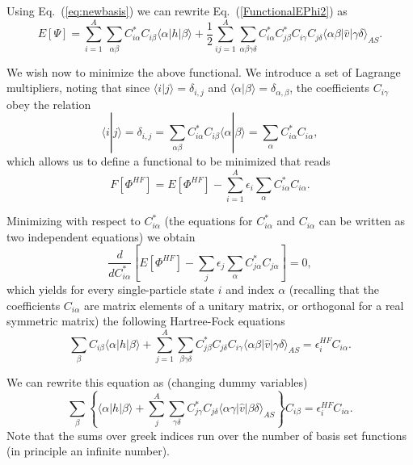 Using Eq.~(\ref{eq:newbasis}) we can rewrite
Eq.~(\ref{FunctionalEPhi2}) as
\begin{equation}
  E[\Psi] 
  = \sum_{i=1}^A \sum_{\alpha\beta} C^*_{i\alpha}C_{i\beta}\langle \alpha | h | \beta \rangle +
  \frac{1}{2}\sum_{ij=1}^A\sum_{{\alpha\beta\gamma\delta}} C^*_{i\alpha}C^*_{j\beta}C_{i\gamma}C_{j\delta}\langle \alpha\beta|\hat{v}|\gamma\delta\rangle_{AS}. \label{FunctionalEPhi3}
\end{equation}


We wish now to minimize the above functional. We introduce a set
of Lagrange multipliers, noting that since $\langle i | j \rangle
= \delta_{i,j}$ and $\langle \alpha | \beta \rangle
= \delta_{\alpha,\beta}$, the coefficients $C_{i\gamma}$ obey the relation
\[
 \langle i | j \rangle=\delta_{i,j}=\sum_{\alpha\beta} C^*_{i\alpha}C_{i\beta}\langle \alpha | \beta \rangle=
\sum_{\alpha} C^*_{i\alpha}C_{i\alpha},
\]
which allows us to define a functional to be minimized that reads
\begin{equation}
  F[\Phi^{HF}]=E[\Phi^{HF}] - \sum_{i=1}^A\epsilon_i\sum_{\alpha} C^*_{i\alpha}C_{i\alpha}.
\end{equation}


Minimizing with respect to $C^*_{i\alpha}$ (the
equations for $C^*_{i\alpha}$ and $C_{i\alpha}$ can be written as two
independent equations) we obtain
\[
\frac{d}{dC^*_{i\alpha}}\left[  E[\Phi^{HF}] - \sum_{j}\epsilon_j\sum_{\alpha} C^*_{j\alpha}C_{j\alpha}\right]=0,
\]
which yields for every single-particle state $i$ and index $\alpha$
(recalling that the coefficients $C_{i\alpha}$ are matrix elements of
a unitary matrix, or orthogonal for a real symmetric matrix) the
following Hartree-Fock equations
\[
\sum_{\beta} C_{i\beta}\langle \alpha | h | \beta \rangle+
\sum_{j=1}^A\sum_{\beta\gamma\delta} C^*_{j\beta}C_{j\delta}C_{i\gamma}\langle \alpha\beta|\hat{v}|\gamma\delta\rangle_{AS}=\epsilon_i^{HF}C_{i\alpha}.
\]


We can rewrite this equation as (changing dummy variables)
\[
\sum_{\beta} \left\{\langle \alpha | h | \beta \rangle+
\sum_{j}^A\sum_{\gamma\delta} C^*_{j\gamma}C_{j\delta}\langle \alpha\gamma|\hat{v}|\beta\delta\rangle_{AS}\right\}C_{i\beta}=\epsilon_i^{HF}C_{i\alpha}.
\]
Note that the sums over greek indices run over the number of basis set
functions (in principle an infinite number).

